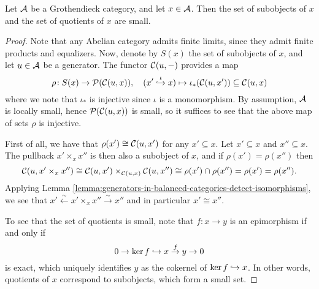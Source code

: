 \begin{proposition}\label{prop:grothendieck-categories-small-set-of-subobjects}
	Let \(\mathcal{A}\) be a Grothendieck category, and let \(x\in\mathcal{A}\). Then the set of subobjects of \(x\) and the set of quotients of \(x\) are small.
\end{proposition}
\begin{proof}
Note that any Abelian category admits finite limits, since they admit finite products and equalizers. Now, denote by \(S(x)\) the set of subobjects of \(x\), and let \(u\in\mathcal{A}\)
be a generator. The functor \(\mathcal{C}(u,-)\) provides a map
\[ \rho\!: S(x) \to \mathcal{P}(\mathcal{C}(u,x)), \quad (x'\overset\iota{\hookrightarrow} x)\mapsto\iota_*(\mathcal{C}(u,x'))\subseteq\mathcal{C}(u,x) \]
where we note that \(\iota_*\) is injective since \(\iota\) is a monomorphism. By assumption, \(\mathcal{A}\) is locally small, hence \(\mathcal{P}(\mathcal{C}(u,x))\) is small, so it suffices
to see that the above map of sets \(\rho\) is injective.

First of all, we have that \(\rho(x')\cong\mathcal{C}(u,x')\) for any \(x'\subseteq x\). Let \(x'\subseteq x\) and \(x''\subseteq x\). The pullback \(x'\times_x x''\) is then also a subobject of \(x\),
and if \(\rho(x') = \rho(x'')\) then
\[ \mathcal{C}(u,x'\times_xx'') \cong \mathcal{C}(u,x')\times_{\mathcal{C}(u,x)}\mathcal{C}(u,x'') \cong \rho(x')\cap\rho(x'') = \rho(x') = \rho(x''). \]
Applying Lemma \ref{lemma:generators-in-balanced-categories-detect-isomorphisms}, we see that \( x'\xleftarrow\sim x'\times_xx''\xrightarrow\sim x'' \) and in particular \(x'\cong x''\).

To see that the set of quotients is small, note that \(f\!:x\to y\) is an epimorphism if and only if
\[ 0\to \ker{f} \hookrightarrow x \overset{f}\to y \to 0 \]
is exact, which uniquely identifies \(y\) as the cokernel of \(\ker{f}\hookrightarrow x\). In other words, quotients of \(x\) correspond to subobjects, which form a small set.
\end{proof}

